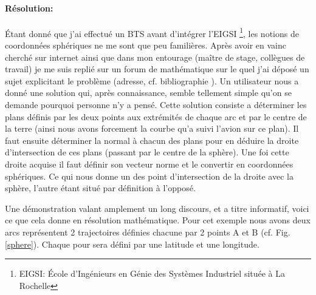             \paragraph{Résolution:}
Étant donné que j'ai effectué un BTS avant d'intégrer l'EIGSI \footnote{EIGSI: École d'Ingénieurs en Génie des Systèmes Industriel située à La Rochelle}, les notions de coordonnées sphériques ne me sont que peu familières. Après avoir en vainc cherché sur internet ainsi que dans mon entourage  (maître de stage, collègues de travail) je me suis replié sur un forum de mathématique sur le quel j'ai déposé un sujet explicitant le problème (adresse, cf. bibliographie \cite{forummath}). Un utilisateur nous a donné une solution qui, après connaissance, semble tellement simple qu'on se demande pourquoi personne n'y a pensé. Cette solution consiste a déterminer les plans définis par les deux points aux extrémités de chaque arc et par le centre de la terre (ainsi nous avons forcement la courbe qu'a suivi l'avion sur ce plan). Il faut ensuite déterminer la normal à chacun des plans pour en déduire la droite d'intersection de ces plans (passant par le centre de la sphère). Une foi cette droite acquise il faut définir son vecteur norme et le convertir en coordonnées sphériques. Ce qui nous donne un des point d'intersection de la droite avec la sphère, l'autre étant situé par définition à l'opposé.

Une démonstration valant amplement un long discours, et a titre informatif, voici ce que cela donne en résolution mathématique. Pour cet exemple nous avons deux arcs représentent 2 trajectoires définies chacune par 2 points A et B (cf. Fig. \vref{sphere}). Chaque pour sera défini par une latitude et une longitude.

